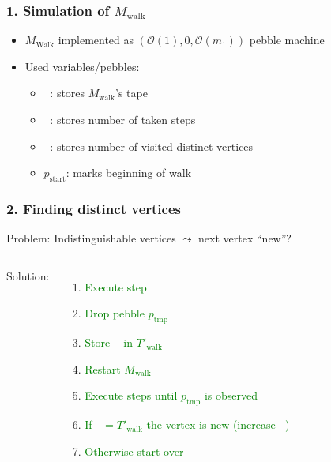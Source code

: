 \documentclass{beamer}
\DeclareMathOperator{\Tid}{T_{\text{id}}}
\DeclareMathOperator{\Tsteps}{T_{\text{steps}}}
\DeclareMathOperator{\Twalk}{T_{\text{walk}}}
\begin{document}
\begin{frame}
  \frametitle{1. Simulation of $M_{\text{walk}}$}
  \begin{itemize}
    \item $M_{\text{Walk}}$ implemented as
      $(\mathcal{O}(1), 0, \mathcal{O}(m_{1}))$ pebble machine
    \item Used variables/pebbles:
      \begin{itemize}
        \item $\Twalk$: stores $M_{\text{walk}}$'s tape
        \item $\Tsteps$: stores number of taken steps
        \item $\Tid$: stores number of visited distinct vertices
        \item $p_{\text{start}}$: marks beginning of walk
      \end{itemize}
  \end{itemize}
\end{frame}

\begin{frame}
  \frametitle{2. Finding distinct vertices}
  Problem: Indistinguishable vertices $\leadsto$ next vertex \enquote{new}?
  \begin{columns}
    Solution:
    \begin{enumerate}
      \item \textcolor<3,8>{green}{Execute step}
      \item \textcolor<4,9>{green}{Drop pebble $p_{\text{tmp}}$}
      \item \textcolor<4,9>{green}{Store $\Twalk$ in $T'_{\text{walk}}$}
      \item \textcolor<5,10>{green}{Restart $M_{\text{walk}}$}
      \item \textcolor<6,11-18>{green}{Execute steps until $p_{\text{tmp}}$ is
        observed}
      \item \textcolor<19-20>{green}{If $\Twalk = T'_{\text{walk}}$ the vertex
        is new (increase $\Tid$)}
      \item \textcolor<7>{green}{Otherwise start over}
    \end{enumerate}
    
  \end{columns}
\end{frame}
\end{document}

